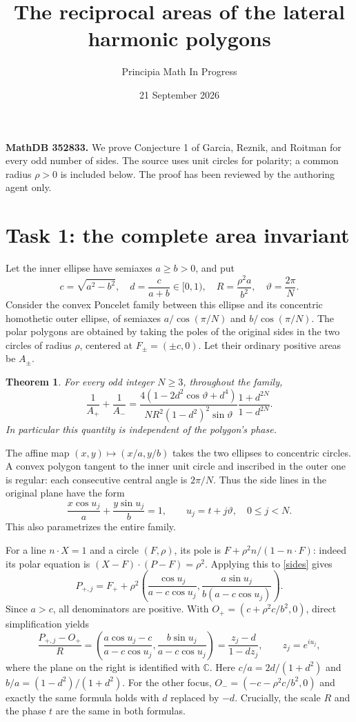 \documentclass[11pt]{article}
\title{The reciprocal areas of the lateral harmonic polygons}
\author{Principia Math In Progress}
\date{21 September 2026}
\newtheorem{theorem}{Theorem}
\begin{document}
\maketitle
\noindent\textbf{MathDB 352833.} We prove Conjecture 1 of Garcia, Reznik,
and Roitman \cite[p.~228]{GRR} for every odd number of sides. The source
uses unit circles for polarity; a common radius $\rho>0$ is included below.
The proof has been reviewed by the authoring agent only.

\section*{Task 1: the complete area invariant}
Let the inner ellipse have semiaxes $a\ge b>0$, and put
\[
 c=\sqrt{a^2-b^2},\quad d=\frac{c}{a+b}\in[0,1),\quad
 R=\frac{\rho^2 a}{b^2},\quad \vartheta=\frac{2\pi}{N}.
\]
Consider the convex Poncelet family between this ellipse and its concentric
homothetic outer ellipse, of semiaxes $a/\cos(\pi/N)$ and
$b/\cos(\pi/N)$. The polar polygons are obtained by taking the poles of
the original sides in the two circles of radius $\rho$, centered at
$F_\pm=(\pm c,0)$. Let their ordinary positive areas be $A_\pm$.

\begin{theorem}\label{main}
For every odd integer $N\ge3$, throughout the family,
\begin{equation}\label{invariant}
 \frac1{A_+}+\frac1{A_-}
 =\frac{4(1-2d^2\cos\vartheta+d^4)}{NR^2(1-d^2)^2\sin\vartheta}
   \frac{1+d^{2N}}{1-d^{2N}}.
\end{equation}
In particular this quantity is independent of the polygon's phase.
\end{theorem}

The affine map $(x,y)\mapsto(x/a,y/b)$ takes the two ellipses to
concentric circles. A convex polygon tangent to the inner unit circle and
inscribed in the outer one is regular: each consecutive central angle is
$2\pi/N$. Thus the side lines in the original plane have the form
\begin{equation}\label{sides}
 \frac{x\cos u_j}{a}+\frac{y\sin u_j}{b}=1,\qquad
 u_j=t+j\vartheta,\quad 0\le j<N.
\end{equation}
This also parametrizes the entire family.

For a line $n\cdot X=1$ and a circle $(F,\rho)$, its pole is
$F+\rho^2n/(1-n\cdot F)$: indeed its polar equation is
$(X-F)\cdot(P-F)=\rho^2$. Applying this to \eqref{sides} gives
\[
 P_{+,j}=F_++\rho^2
 \left(\frac{\cos u_j}{a-c\cos u_j},
       \frac{a\sin u_j}{b(a-c\cos u_j)}\right).
\]
Since $a>c$, all denominators are positive. With
$O_+=(c+\rho^2c/b^2,0)$, direct simplification yields
\begin{equation}\label{mobius}
 \frac{P_{+,j}-O_+}{R}
 =\left(\frac{a\cos u_j-c}{a-c\cos u_j},
         \frac{b\sin u_j}{a-c\cos u_j}\right)
 =\frac{z_j-d}{1-dz_j},\qquad z_j=e^{iu_j},
\end{equation}
where the plane on the right is identified with $\mathbb C$.
Here $c/a=2d/(1+d^2)$ and $b/a=(1-d^2)/(1+d^2)$.
For the other focus, $O_-=(-c-\rho^2c/b^2,0)$ and exactly the same
formula holds with $d$ replaced by $-d$. Crucially, the scale $R$ and
the phase $t$ are the same in both formulas.
\end{document}
